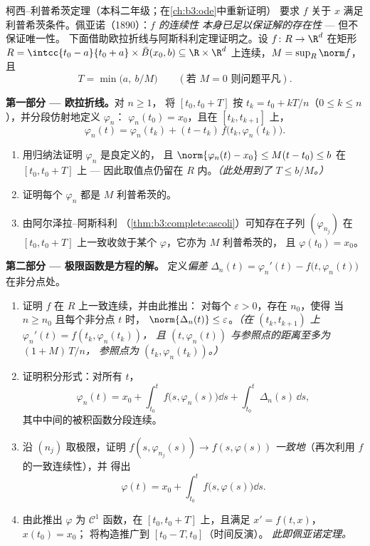 \begin{problem}[{周末问题 --- 无利普希茨条件时
$x' = f(t, x)$ 解的存在性}]\label{pb:b3:complete:1}
柯西–利普希茨定理（本科二年级；在\cref{ch:b3:ode}中重新证明）
要求 $f$ 关于 $x$ 满足利普希茨条件。佩亚诺（1890）：\emph{$f$ 的连续性
本身已足以保证解的存在性} --- 但不保证唯一性。
下面借助欧拉折线与阿斯科利定理证明之。设 $f \colon R
\to \R^d$ 在矩形 $R = \intcc{t_0 - a}{t_0
+ a}\times \bar B(x_0, b) \subseteq \R\times\R^d$ 上连续，$M =
\sup_R\norm f$，且
\[
T = \min\bigl(a,\ b/M\bigr)
\qquad (\text{若 } M = 0 \text{ 则问题平凡}).
\]

\medskip
\noindent\textbf{第一部分 --- 欧拉折线。}对 $n \geq 1$，
将 $[t_0, t_0 + T]$ 按 $t_k = t_0 + kT/n$（$0 \leq k
\leq n$），并分段仿射地定义 $\varphi_n$：
$\varphi_n(t_0) = x_0$，且在 $[t_k, t_{k+1}]$ 上，
\[
\varphi_n(t) = \varphi_n(t_k) + (t -
t_k)\,f\bigl(t_k, \varphi_n(t_k)\bigr).
\]
\begin{enumerate}
  \item 用归纳法证明 $\varphi_n$ 是良定义的，
        且 $\norm{\varphi_n(t) - x_0} \leq M(t - t_0) \leq b$
        在 $[t_0, t_0 + T]$ 上 --- 因此取值点仍留在
        $R$ 内。\emph{（此处用到了 $T \leq b/M$。）}
  \item 证明每个 $\varphi_n$ 都是 $M$ 利普希茨的。
  \item 由阿尔泽拉–阿斯科利
        （\cref{thm:b3:complete:ascoli}）可知存在子列
        $(\varphi_{n_j})$ 在 $[t_0, t_0 +
        T]$ 上一致收敛于某个 $\varphi$，它亦为 $M$ 利普希茨的，
        且 $\varphi(t_0) = x_0$。
\end{enumerate}

\medskip
\noindent\textbf{第二部分 --- 极限函数是方程的解。}
定义\emph{偏差} $\Delta_n(t) = \varphi_n'(t) -
f\bigl(t, \varphi_n(t)\bigr)$ 在非分点处。
\begin{enumerate}[resume]
  \item 证明 $f$ 在 $R$ 上一致连续，并由此推出：
        对每个 $\varepsilon > 0$，存在 $n_0$，使得
        当 $n \geq n_0$ 且每个非分点 $t$ 时，
        $\norm{\Delta_n(t)} \leq \varepsilon$。\emph{（在 $(t_k,
        t_{k+1})$ 上 $\varphi_n'(t) = f(t_k, \varphi_n(t_k))$，
        且 $(t, \varphi_n(t))$ 与参照点的距离至多为 $(1 + M)\,T/n$，
        参照点为 $(t_k, \varphi_n(t_k))$。）}
  \item 证明积分形式：对所有 $t$，
        \[
        \varphi_n(t) = x_0 + \int_{t_0}^{t}
        f\bigl(s, \varphi_n(s)\bigr)\dd s +
        \int_{t_0}^t \Delta_n(s)\,\dd s,
        \]
        其中中间的被积函数分段连续。
  \item 沿 $(n_j)$ 取极限，证明
        $f(s, \varphi_{n_j}(s)) \to f(s, \varphi(s))$
        \emph{一致地}（再次利用 $f$ 的一致连续性），并
        得出
        \[
        \varphi(t) = x_0 + \int_{t_0}^t
        f\bigl(s, \varphi(s)\bigr)\dd s .
        \]
  \item 由此推出 $\varphi$ 为 $\mathcal C^1$ 函数，在 $[t_0, t_0 +
        T]$ 上，且满足 $x' = f(t, x)$，$x(t_0) = x_0$；
        将构造推广到 $[t_0 - T, t_0]$（时间反演）。
        \emph{此即佩亚诺定理。}
\end{enumerate}


\end{problem}

